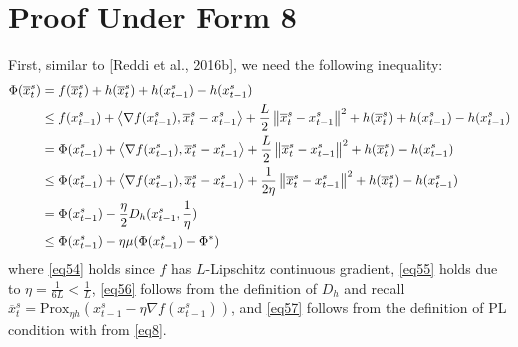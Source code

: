 \documentclass{article}
\newcommand*{\Po}{\text{Prox}}
\newcommand{\norm}[1]{\left\lVert#1\right\rVert}
\newcommand{\Iprod}[2]{\left\langle #1,#2\right\rangle}
\theoremstyle{definition}
\theoremstyle{remark}
\begin{document}
\section{Proof Under Form 8}
First, similar to [Reddi et al., 2016b], we need the following inequality:
\begin{align}
\Phi(\overline{x}^s_t) &= f(\overline{x}^s_t)+h(\overline{x}^s_t) + h({x}^s_{t-1}) - h({x}^s_{t-1})\notag \\
&\leq f({x}^s_{t-1})+\Iprod{\nabla f({x}^s_{t-1})}{\overline{x}^s_t-{x}^s_{t-1}}+\frac{L}{2}\norm{\overline{x}^s_t - {x}^s_{t-1}}^2+h(\overline{x}^s_t) + h({x}^s_{t-1}) - h({x}^s_{t-1})\label{eq54}\\
&= \Phi({x}^s_{t-1})+\Iprod{\nabla f({x}^s_{t-1})}{\overline{x}^s_t-{x}^s_{t-1}}+\frac{L}{2}\norm{\overline{x}^s_t - {x}^s_{t-1}}^2+h(\overline{x}^s_t) - h({x}^s_{t-1})\\
&\leq \Phi({x}^s_{t-1})+\Iprod{\nabla f({x}^s_{t-1})}{\overline{x}^s_t-{x}^s_{t-1}}+\frac{1}{2\eta}\norm{\overline{x}^s_t - {x}^s_{t-1}}^2+h(\overline{x}^s_t) - h({x}^s_{t-1})\label{eq55}\\
&= \Phi({x}^s_{t-1})-\frac{\eta}{2} D_h({x}^s_{t-1},\frac{1}{\eta})\label{eq56}\\
&\leq \Phi({x}^s_{t-1})-\eta\mu(\Phi({x}^s_{t-1}) - \Phi^*)\label{eq57}
\end{align}
where \eqref{eq54} holds since $f$ has $L$-Lipschitz continuous gradient, \eqref{eq55} holds due to $\eta = \frac{1}{6L} < \frac{1}{L}$, \eqref{eq56} follows from the
definition of $D_h$ and recall $\overline{x}^s_t = \Po_{\eta h}({x}^s_{t-1}-\eta \nabla f({x}^s_{t-1}))$, and     
\eqref{eq57} follows from the definition of PL condition with from \eqref{eq8}. 
\end{document}
